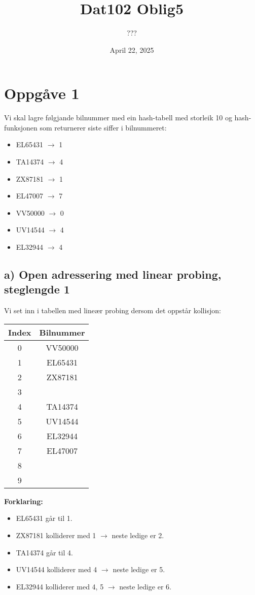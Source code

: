 \documentclass[12pt]{article}
\title{Dat102 Oblig5}
\author{???}
\date{April 22, 2025}
\begin{document}
\maketitle

\section*{Oppgåve 1}

Vi skal lagre følgjande bilnummer med ein hash-tabell med storleik 10 og hash-funksjonen som returnerer siste siffer i bilnummeret:

\begin{itemize}
    \item EL65431 $\rightarrow$ 1
    \item TA14374 $\rightarrow$ 4
    \item ZX87181 $\rightarrow$ 1
    \item EL47007 $\rightarrow$ 7
    \item VV50000 $\rightarrow$ 0
    \item UV14544 $\rightarrow$ 4
    \item EL32944 $\rightarrow$ 4
\end{itemize}

\subsection*{a) Open adressering med linear probing, steglengde 1}

Vi set inn i tabellen med lineær probing dersom det oppstår kollisjon:

\begin{center}
\begin{tabular}{|c|c|}
\hline
Index & Bilnummer \\
\hline
0 & VV50000 \\
1 & EL65431 \\
2 & ZX87181 \\
3 & \\
4 & TA14374 \\
5 & UV14544 \\
6 & EL32944 \\
7 & EL47007 \\
8 & \\
9 & \\
\hline
\end{tabular}
\end{center}

\noindent 
\textbf{Forklaring:}
\begin{itemize}
    \item EL65431 går til 1.
    \item ZX87181 kolliderer med 1 $\rightarrow$ neste ledige er 2.
    \item TA14374 går til 4.
    \item UV14544 kolliderer med 4 $\rightarrow$ neste ledige er 5.
    \item EL32944 kolliderer med 4, 5 $\rightarrow$ neste ledige er 6.
\end{itemize}
\end{document}
